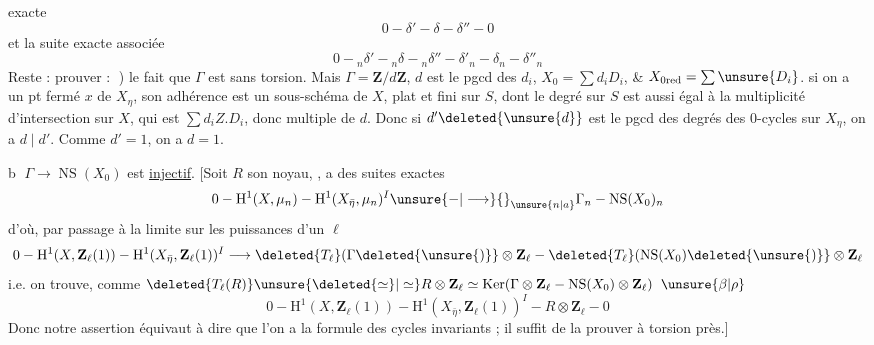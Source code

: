 exacte
\[
0\mathbin{-}\delta'\mathbin{-}\delta\mathbin{-}\delta''\mathbin{-}0
\]
et la suite exacte associée
\[
0\mathbin{-}{}_n\delta'\mathbin{-}{}_n\delta\mathbin{-}{}_n\delta''\mathbin{-}\delta'_n\mathbin{-}\delta_n\mathbin{-}\delta''_n
\]
Reste : prouver : \textcircled{}) le fait que $\Gamma$ est sans torsion. Mais $\Gamma=\mathbf Z/d\mathbf Z$,  $d$ est le pgcd des $d_i$, $X_0=\sum d_iD_i$, \& $X_{0\mathrm{red}}=\sum\unsure{D_i}$.  si on a un pt fermé $x$ de $X_\eta$, son adhérence  est un sous-schéma   de $X$, plat et fini sur $S$,  dont le degré sur $S$ est aussi égal à la multiplicité d'intersection  sur $X$, qui est $\sum d_iZ.D_i$, donc multiple de $d$. Donc si $d'\deleted{\unsure{d}}$ est le pgcd des degrés des 0-cycles sur $X_\eta$, on a $d\mid d'$. Comme $d'=1$, on a $d=1$.

\textcircled{b} $\Gamma\longrightarrow\operatorname{NS}(X_0)$ est \uline{injectif}.
[Soit $R$ son noyau, ,  a des suites exactes
\[
0\mathbin{-}\mathrm H^1(X,\mu_n)\mathbin{-}\mathrm H^1(X_{\bar\eta},\mu_n)^I\unsure{\mathbin{-}|\longrightarrow}{}_{\unsure{n|a}}\Gamma_n\mathbin{-}\operatorname{NS}(X_0)_n
\]
d'où, par passage à la limite sur les puissances d'un $\ell$
\[
0\mathbin{-}\mathrm H^1(X,\mathbf Z_\ell(1))\mathbin{-}\mathrm H^1(X_{\bar\eta},\mathbf Z_\ell(1))^I\longrightarrow\deleted{T_\ell}(\Gamma\deleted{\unsure{)}}\otimes\mathbf Z_\ell\mathbin{-}\deleted{T_\ell}(\operatorname{NS}(X_0)\deleted{\unsure{)}}\otimes\mathbf Z_\ell
\]
i.e. on trouve, comme $\deleted{T_\ell(R)}\unsure{\deleted{\simeq}|\simeq}R\otimes\mathbf Z_\ell\simeq\operatorname{Ker}(\Gamma\otimes\mathbf Z_\ell\mathbin{-}\operatorname{NS}(X_0)\otimes\mathbf Z_\ell)$
\quad$\unsure{\beta|\rho}$
\[
0\mathbin{-}\mathrm H^1(X,\mathbf Z_\ell(1))\mathbin{-}\mathrm H^1(X_{\bar\eta},\mathbf Z_\ell(1))^I\mathbin{-}R\otimes\mathbf Z_\ell\mathbin{-}0
\]
Donc notre assertion équivaut à dire que l'on a la formule des cycles invariants ;  il suffit  de la prouver à torsion près.]

